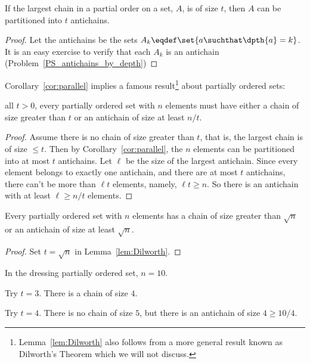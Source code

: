 \begin{corollary}\label{cor:parallel}
If the largest chain in a partial order on a set, $A$, is of size $t$,
then $A$ can be partitioned into $t$ antichains.
\end{corollary}

\begin{proof}
Let the antichains be the sets $A_k \eqdef \set{a \suchthat \dpth{a}
  =k}$.
It is an easy exercise to verify that each $A_k$ is an antichain
(Problem~\ref{PS_antichains_by_depth})
\end{proof}

Corollary~\ref{cor:parallel} implies a famous
result\footnote{Lemma~\ref{lem:Dilworth} also follows from a more
  general result known as Dilworth's Theorem which we will not
  discuss.} about partially ordered sets:

\begin{lemma}[Dilworth]\label{lem:Dilworth}
 all $t>0$, every partially ordered set with
$n$ elements must have either a chain of size greater than $t$ or an
antichain of size at least $n / t$.
\end{lemma}

\begin{proof}
Assume there is no chain of size greater than $t$, that is, the largest
chain is of size $\le t$.  Then by Corollary~\ref{cor:parallel}, the $n$
elements can be partitioned into at most $t$ antichains.  Let $\ell$ be
the size of the largest antichain.  Since every element belongs to exactly
one antichain, and there are at most $t$ antichains, there can't be more
than $\ell t$ elements, namely, $\ell t \geq n$.  So there is an antichain
with at least $\ell \geq n / t$ elements.
\end{proof}

\begin{corollary}\label{cor:Dilworth}
Every partially ordered set with $n$ elements has a chain of size greater
than $\sqrt{n}$ or an antichain of size at least $\sqrt{n}$.

\begin{proof}
  Set $t = \sqrt{n}$ in Lemma~\ref{lem:Dilworth}.
\end{proof}
\end{corollary}

\begin{example}
In the dressing partially ordered set, $n = 10$.

Try $t = 3$.  There is a chain of size $4$.

Try $t = 4$.  There is no chain of size $5$, but there is an antichain of
size $4 \geq 10 / 4$.
\end{example}

